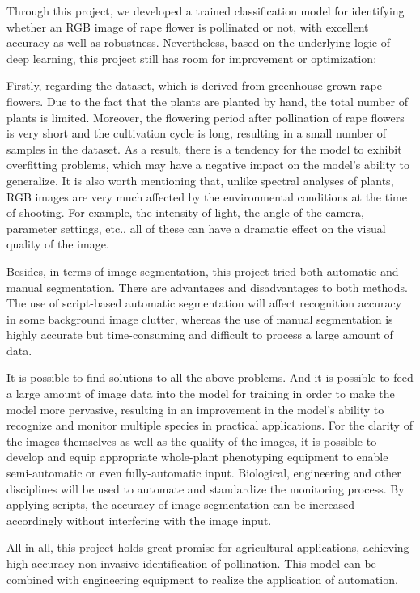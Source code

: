 \documentclass[11pt,a4paper]{article}
\begin{document}
\begin{spacing}{1.5}
Through this project, we developed a trained classification model for identifying whether an RGB image of rape flower is pollinated or not, with excellent accuracy as well as robustness. Nevertheless, based on the underlying logic of deep learning, this project still has room for improvement or optimization:

Firstly, regarding the dataset, which is derived from greenhouse-grown rape flowers. Due to the fact that the plants are planted by hand, the total number of plants is limited. Moreover, the flowering period after pollination of rape flowers is very short and the cultivation cycle is long, resulting in a small number of samples in the dataset. As a result, there is a tendency for the model to exhibit overfitting problems, which may have a negative impact on the model's ability to generalize. It is also worth mentioning that, unlike spectral analyses of plants, RGB images are very much affected by the environmental conditions at the time of shooting. For example, the intensity of light, the angle of the camera, parameter settings, etc., all of these can have a dramatic effect on the visual quality of the image.

Besides, in terms of image segmentation, this project tried both automatic and manual segmentation. There are advantages and disadvantages to both methods. The use of script-based automatic segmentation will affect recognition accuracy in some background image clutter, whereas the use of manual segmentation is highly accurate but time-consuming and difficult to process a large amount of data.

It is possible to find solutions to all the above problems. And it is possible to feed a large amount of image data into the model for training in order to make the model more pervasive, resulting in an improvement in the model's ability to recognize and monitor multiple species in practical applications. For the clarity of the images themselves as well as the quality of the images, it is possible to develop and equip appropriate whole-plant phenotyping equipment to enable semi-automatic or even fully-automatic input. Biological, engineering and other disciplines will be used to automate and standardize the monitoring process. By applying scripts, the accuracy of image segmentation can be increased accordingly without interfering with the image input.

All in all, this project holds great promise for agricultural applications, achieving high-accuracy non-invasive identification of pollination. This model can be combined with engineering equipment to realize the application of automation.




\end{spacing}
\end{document}

